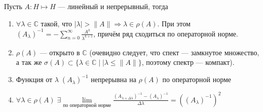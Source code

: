\documentclass[12pt]{article}
\begin{document}
\begin{Theor}
    Пусть $A : H \mapsto H$ --- линейный и непрерывный, тогда
    \begin{enumerate}
        \item{$\forall \lambda \in \mathbb C$ такой, что $|\lambda| > \|A\| \Rightarrow \lambda \in \rho(A)$.
            При этом $(A_\lambda)^{-1} = -\sum \limits_{n = 0}^{\infty}\frac{A^k}{\lambda^{k+1}}$, причём ряд сходиться по операторной норме.}
        \item{$\rho(A)$ --- открыто в $\mathbb C$ (очевидно следует, что спект --- замкнутое множество, а так же $\sigma(A) \subset \{ \lambda \in \mathbb C \mid |\lambda
            \le \|A\|\}$, поэтому спектр --- компакт).}
        \item{Функция от $\lambda\;(A_\lambda)^{-1}$ непрерывна на $\rho(A)$ по операторной норме}
        \item{$\forall \lambda \in \rho(A)\;\exists \lim\limits_{\text{по операторной норме}}\frac{(A_{\lambda + \Delta \lambda})^{-1} - (A_\lambda)^{-1}}{\Delta\lambda} =
            ((A_\lambda)^{-1})^2$}
    \end{enumerate}
\end{Theor}
\end{document}
